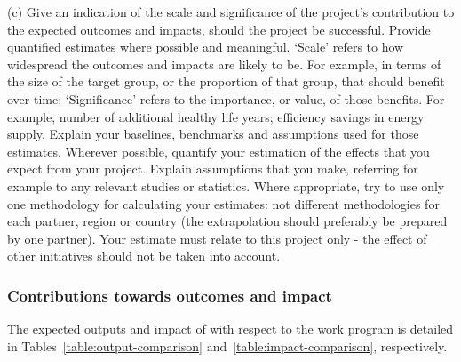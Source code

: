 \begin{draft}
{(c)	 Give an indication of the scale and significance of the project’s contribution to the expected outcomes and impacts, should the project be successful.  Provide quantified estimates where possible and meaningful.
	‘Scale’ refers to how widespread the outcomes and impacts are likely to be. For example, in terms of the size of the target group, or the proportion of that group, that should benefit over time; ‘Significance’ refers to the importance, or value, of those benefits. For example, number of additional healthy life years; efficiency savings in energy supply.
	Explain your baselines, benchmarks and assumptions used for those estimates. Wherever possible, quantify your estimation of the effects that you expect from your project. Explain assumptions that you make, referring for example to any relevant studies or statistics. Where appropriate, try to use only one methodology for calculating your estimates: not different methodologies for each partner, region or country (the extrapolation should preferably be prepared by one partner).
	Your estimate must relate to this project only - the effect of other initiatives should not be taken into account.
}
\end{draft}

\subsubsection{Contributions towards outcomes and impact}
\label{sec:countributions-towards-outcome-and-impact}

The expected outputs and impact of \TheProject with respect to the
work program is detailed in Tables~\ref{table:output-comparison}
and~\ref{table:impact-comparison}, respectively.

